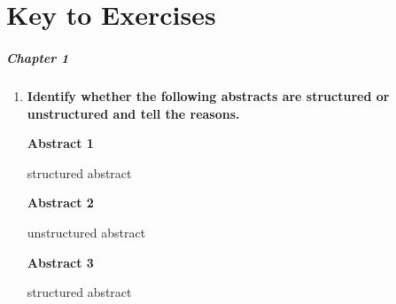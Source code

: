 \documentclass[a4paper]{ctexbook}
\begin{document}
\restoregeometry

\chapter*{Key to Exercises}

\paragraph*{Chapter 1}\par
\begin{enumerate}
  \item \textbf{Identify whether the following abstracts are structured or unstructured and tell the reasons.}
  
  \textbf{Abstract 1}
  
  \hspace*{2em}structured abstract 
  
  \textbf{Abstract 2}

  \hspace*{2em}unstructured abstract 
  
  \textbf{Abstract 3}

  \hspace*{2em}structured abstract
\end{enumerate}
\end{document}
